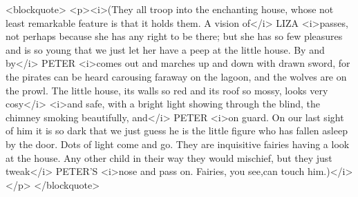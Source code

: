 <blockquote>
<p><i>(They all troop into the enchanting house, whose not least
remarkable feature is that it holds them. A vision of</i> LIZA
<i>passes, not perhaps because she has any right to be there; but she
has so few pleasures and is so young that we just let her have a peep
at the little house. By and by</i> PETER <i>comes out and marches up
and down with drawn sword, for the pirates can be heard carousing
faraway on the lagoon, and the wolves are on the prowl. The little
house, its walls so red and its roof so mossy, looks very cosy</i>
<i>and safe, with a bright light showing through the blind, the
chimney smoking beautifully, and</i> PETER <i>on guard. On our last
sight of him it is so dark that we just guess he is the little figure
who has fallen asleep by the door. Dots of light come and go. They
are inquisitive fairies having a look at the house. Any other child
in their way they would mischief, but they just tweak</i> PETER'S
<i>nose and pass on. Fairies, you see,can touch him.)</i></p>
</blockquote>
